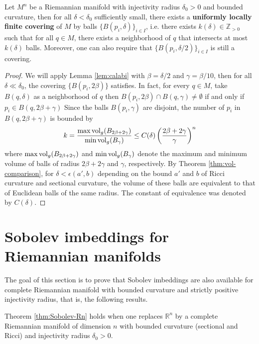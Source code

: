 \documentclass[11pt]{article}
\begin{document}
\begin{lemma}
\label{lem:uni-loc-finite-cover}
Let \(M^n\) be a Riemannian manifold with injectivity radius \(\delta_0>0\) and
bounded curvature, then for all \(\delta <\delta_0\) sufficiently small, there exists a \textbf{uniformly locally
finite covering} of \(M\) by balls \(\{B(p_i,\delta)\}_{i\in I}\), i.e. there exists
\(k(\delta)\in \mathbb{Z}_{>0}\) such that for all \(q\in M\), there exists a
neighborhood of \(q\) that intersects at most \(k(\delta)\) balls. Moreover, one can
also require that \(\{B(p_i,\delta/2)\}_{i\in I}\) is still a covering.  
\end{lemma}

\begin{proof}
We will apply Lemma \ref{lem:calabi} with \(\beta = \delta/2\) and
\(\gamma = \beta/10\), then for all \(\delta \ll \delta_0\), the covering
\(\{B(p_i, 2\beta) \}\) satisfies. In fact, for every \(q\in M\), take
\(B(q,\delta)\) as a neighborhood of \(q\) then
\(B(p_i,2\beta)\cap B(q,\gamma)\ne \emptyset\) if and only if
\(p_i\in B(q,2\beta + \gamma)\) Since the balls \(B(p_i,\gamma)\) are disjoint, the
number of \(p_i\) in \(B(q,2\beta +\gamma)\) is bounded by
\[
k = \frac{\max \mathop{\rm vol}\nolimits_g (B_{2\beta+2\gamma})}{\min\mathop{\rm vol}\nolimits_g (B_\gamma)} \leq C(\delta)\left(\frac{2\beta+2\gamma}{\gamma}\right)^n
\]
where \(\max \mathop{\rm vol}\nolimits_g (B_{2\beta+2\gamma})\) and \(\min\mathop{\rm vol}\nolimits_g (B_\gamma)\) denote the
maximum and minimum volume of balls of radius \(2\beta + 2\gamma\) and \(\gamma\),
respectively. By Theorem \ref{thm:vol-comparison}, for \(\delta < \epsilon(a',b)\) depending on
the bound \(a'\) and \(b\) of Ricci curvature and sectional curvature, the volume of
these balls are equivalent to that of Euclidean balls of the same radius. The constant of
equivalence was denoted by \(C(\delta)\).
\end{proof}


\section{Sobolev imbeddings for Riemannian manifolds}
\label{sec:org988defc}

The goal of this section is to prove that Sobolev imbeddings are also available for complete Riemannian manifold
with bounded curvature and strictly positive injectivity radius, that is, the following results.

\begin{theorem}
\label{thm:sobolev-imbedding}
Theorem \ref{thm:Sobolev-Rn} holds when one replaces \(\mathbb{R}^{n}\) by a complete Riemannian
manifold of dimension \(n\) with bounded curvature (sectional and Ricci) and injectivity radius \(\delta_0 >0\).
\end{theorem}
\end{document}
